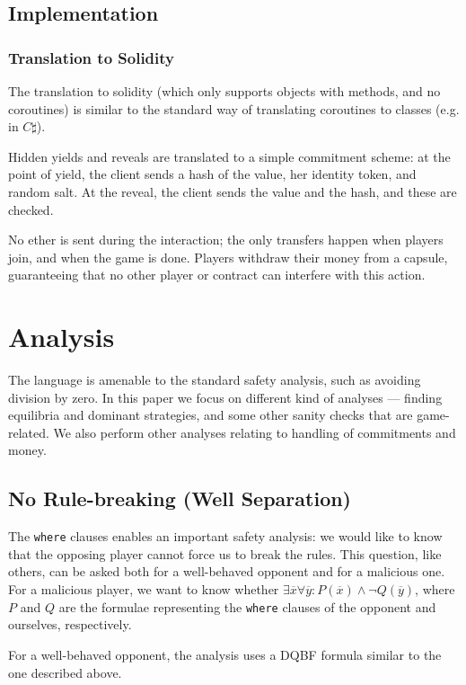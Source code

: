 \documentclass[acmsmall,review,anonymous]{acmart}\settopmatter{printfolios=true,printccs=false,printacmref=false}
\begin{document}
\subsection{Implementation}
\subsubsection{Translation to Solidity}
The translation to solidity (which only supports objects with methods, and no coroutines) is similar to the standard way of translating coroutines to classes (e.g. in $C\sharp$).

Hidden yields and reveals are translated to a simple commitment scheme: at the point of yield, the client sends a hash of the value, her identity token, and random salt. At the reveal, the client sends the value and the hash, and these are checked.

No ether is sent during the interaction; the only transfers happen when players join, and when the game is done. Players withdraw their money from a capsule, guaranteeing that no other player or contract can interfere with this action.

\section{Analysis}
The language is amenable to the standard safety analysis, such as avoiding division by zero. In this paper we focus on different kind of analyses --- finding equilibria and dominant strategies, and some other sanity checks that are game-related. We also perform other analyses relating to handling of commitments and money.

\subsection{No Rule-breaking (Well Separation)}
The \texttt{where} clauses enables an important safety analysis: we would like to know that the opposing player cannot force us to break the rules. This question, like others, can be asked both for a well-behaved opponent and for a malicious one. For a malicious player, we want to know whether $\exists \overline{x} \forall \overline{y}: P(\overline{x})\wedge \neg Q(\overline{y})$, where $P$ and $Q$ are the formulae representing the \texttt{where} clauses of the opponent and ourselves, respectively.

For a well-behaved opponent, the analysis uses a DQBF formula similar to the one described above.
\end{document}
